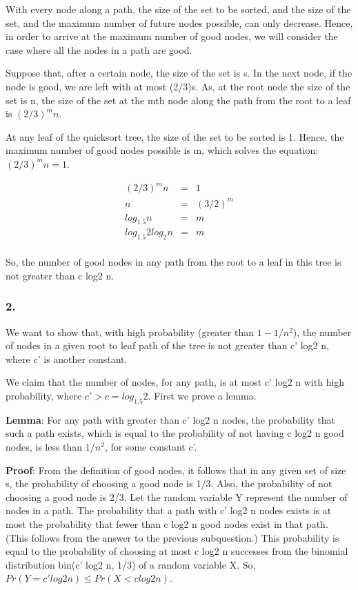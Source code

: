 \documentclass[10pt]{article}
\begin{document}
With every node along a path, the size of the set to be sorted, and the size of the set, and the maximum number of future nodes possible, can only decrease. Hence, in order to arrive at the maximum number of good nodes, we will consider the case where all the nodes in a path are good.

Suppose that, after a certain node, the size of the set is s. In the next node, if the node is good, we are left with at most (2/3)s. As, at the root node the size of the set is n, the size of the set at the mth node along the path from the root to a leaf is $(2/3)^{m}n$.

At any leaf of the quicksort tree, the size of the set to be sorted is 1. Hence, the maximum number of good nodes possible is m, which solves the equation: $(2/3)^{m}n=1$.

\begin{eqnarray}
(2/3)^{m}n &=& 1\\
n &=& (3/2)^{m}\\
log_{1.5}n &=& m\\
log_{1.5}2 log_{2}n &=& m\\
\end{eqnarray}

So, the number of good nodes in any path from the root to a leaf in this tree is not greater than c log2 n.

\subsubsection{2.}

We want to show that, with high probability (greater than $1-1/n^{2}$), the number of nodes in a given root to leaf path of the tree is not greater than c' log2 n, where c' is another constant.

We claim that the number of nodes, for any path, is at most c' log2 n with high probability, where $c' > c = log_{1.5}2$. First we prove a lemma.

\textbf{Lemma}: For any path with greater than c' log2 n nodes, the probability that such a path exists, which is equal to the probability of not having c log2 n good nodes, is less than $1/n^{2}$, for some constant c'.

\textbf{Proof}: From the definition of good nodes, it follows that in any given set of size s, the probability of choosing a good node is 1/3. Also, the probability of not choosing a 
good node is 2/3. Let the random variable Y represent the number of nodes in a path. The probability that a path with c' log2 n nodes exists is at most the probability that fewer than c log2 n good nodes exist in that path. (This follows from the answer to the previous subquestion.) This probability is equal to the probability of choosing at most c log2 n successes from the binomial distribution bin(c' log2 n, 1/3) of a random variable X. So, $Pr(Y = c' log2 n) \leq Pr(X<c log2 n)$.
\end{document}
